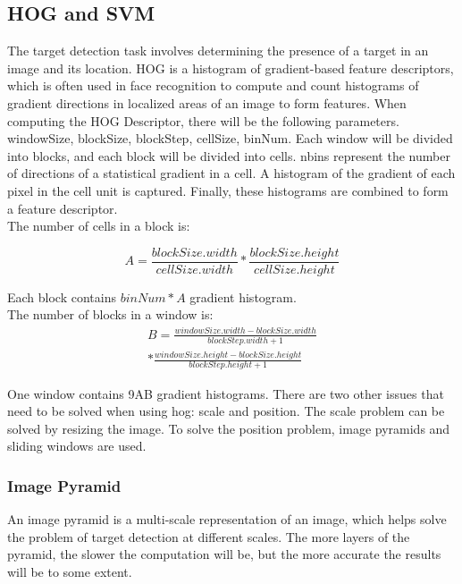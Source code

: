 \documentclass[conference]{IEEEtran}
\begin{document}
\subsection{HOG and SVM}
The target detection task involves determining the presence of a target in an image and its location. HOG is a histogram of gradient-based feature descriptors, which is often used in face recognition to compute and count histograms of gradient directions in localized areas of an image to form features.
When computing the HOG Descriptor, there will be the following parameters. windowSize, blockSize, blockStep, cellSize, binNum. Each window will be divided into blocks, and each block will be divided into cells. nbins represent the number of directions of a statistical gradient in a cell. A histogram of the gradient of each pixel in the cell unit is captured. Finally, these histograms are combined to form a feature descriptor.\\		
The number of cells in a block is:


\begin{equation}
A = {\frac{blockSize.width}{cellSize.width}}* {\frac{blockSize.height}{cellSize.height}}
\end{equation}

Each block contains $binNum*A$ gradient histogram.\\
The number of blocks in a window is:\\

\begin{equation}
\begin{aligned}
B= {\frac{windowSize.width-blockSize.width}{blockStep.width+1}}\\ *  {\frac{windowSize.height-blockSize.height}{blockStep.height+1}}
\end{aligned}
\end{equation}

One window contains 9AB gradient histograms. There are two other issues that need to be solved when using hog: scale and position. The scale problem can be solved by resizing the image. To solve the position problem, image pyramids and sliding windows are used.

\subsubsection{Image Pyramid}

An image pyramid is a multi-scale representation of an image, which helps solve the problem of target detection at different scales. The more layers of the pyramid, the slower the computation will be, but the more accurate the results will be to some extent.
\end{document}
